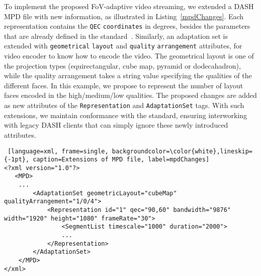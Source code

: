  To implement the proposed
\ac{FoV}-adaptive video streaming, we extended a \ac{DASH} \ac{MPD}
file with new information, as illustrated in Listing~\ref{mpdChanges}.
Each representation contains the \texttt{\ac{QEC}}
\texttt{coordinates} in degrees, besides the parameters that are
already defined in the standard~\cite{iso_iec}. Similarly, an
adaptation set is extended with \texttt{geometrical} \texttt{layout}
and \texttt{quality} \texttt{arrangement} attributes, for video
encoder to know how to encode the video. The geometrical layout is one
of the projection types (equirectangular, cube map, pyramid or
dodecahadron), while the quality arrangement takes a string value
specifying the qualities of the different faces. In this example, we
propose to represent the number of layout faces encoded in the
high/medium/low qualities. The proposed changes are added as new
attributes of the \texttt{Representation} and \texttt{AdaptationSet}
tags. With such extensions, we maintain conformance with the standard,
ensuring interworking with legacy \ac{DASH} clients that can simply
ignore these newly introduced attributes.

\begin{minipage}{\linewidth}
\begin {lstlisting} [language=xml, frame=single, backgroundcolor=\color{white},lineskip={-1pt}, caption=Extensions of MPD file, label=mpdChanges]
<?xml version="1.0"?>
   <MPD>
    ...
        <AdaptationSet geometricLayout="cubeMap" qualityArrangement="1/0/4">
            <Representation id="1" qec="90,60" bandwidth="9876" width="1920" height="1080" frameRate="30">
                <SegmentList timescale="1000" duration="2000">
                ...
            </Representation>
        </AdaptationSet>
    </MPD>
</xml>
\end{lstlisting}
\end{minipage}
